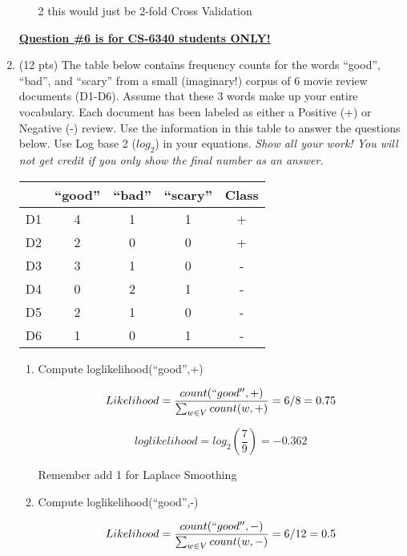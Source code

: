\documentclass[11pt]{article}
\begin{document}
\begin{enumerate}
\begin{enumerate}
  2 this would just be 2-fold Cross Validation

\end{enumerate}


\newpage

\underline{\textbf{Question \#6 is for CS-6340 students ONLY!}}  \\

\item (12 pts) The table below contains frequency counts for the
  words ``good'', ``bad'', and ``scary'' from a small (imaginary!)
  corpus of 6 movie review documents (D1-D6).  Assume that these 3
  words make up your entire vocabulary. Each document has been labeled as
 either a Positive (+) or Negative (-) review. Use the information in this table
  to answer the questions below. Use Log base 2 ($log_2$) in your
  equations.  {\it Show all your work! You will not
  get credit if you only show the final number as an answer.}

\begin{center}
\begin{tabular}{|l|c|c|c||c|} \hline
~ & {\bf ``good''} & {\bf ``bad''} & {\bf ``scary''} & {\bf Class} \\ \hline
D1 & 4 & 1 & 1 & + \\
D2 & 2 & 0 & 0 & + \\ \hline
D3 & 3 & 1 & 0 & - \\
D4 & 0 & 2 & 1 & - \\
D5 & 2 & 1 & 0 & - \\
D6 & 1 & 0 & 1 & - \\ \hline
\end{tabular}
\end{center}

\vspace*{.1in}
\begin{enumerate}
\item Compute loglikelihood(``good'',+)

$$Likelihood = \frac{count(``good'', +)}{\sum_{w \in V} count(w, +)} = 6/8 = 0.75$$ 

$$loglikelihood = log_2 (\frac{7}{9}) = -0.362$$

Remember add 1 for Laplace Smoothing

\item Compute loglikelihood(``good'',-)

$$Likelihood = \frac{count(``good'', -)}{\sum_{w \in V} count(w, -)} = 6/12 = 0.5$$ 


\end{enumerate}
\end{enumerate}
\end{document}
